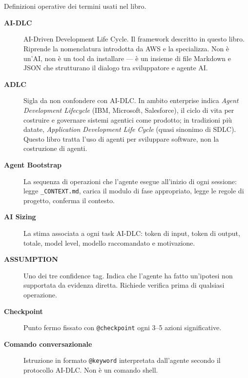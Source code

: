 ﻿%

\chapter{\LabelGlossary}
\label{app:glossario}

Definizioni operative dei termini usati nel libro.

\begin{description}

\item[\textbf{AI-DLC}] AI-Driven Development Life Cycle. Il framework descritto in questo libro. Riprende la nomenclatura introdotta da AWS e la specializza. Non è un'AI, non è un tool da installare --- è un insieme di file Markdown e JSON che strutturano il dialogo tra sviluppatore e agente AI.

\item[\textbf{ADLC}] Sigla da non confondere con AI-DLC. In ambito enterprise indica \textit{Agent Development Lifecycle} (IBM, Microsoft, Salesforce), il ciclo di vita per costruire e governare sistemi agentici come prodotto; in tradizioni più datate, \textit{Application Development Life Cycle} (quasi sinonimo di SDLC). Questo libro tratta l'uso di agenti per sviluppare software, non la costruzione di agenti.

\item[\textbf{Agent Bootstrap}] La sequenza di operazioni che l'agente esegue all'inizio di ogni sessione: legge \texttt{\_CONTEXT.md}, carica il modulo di fase appropriato, legge le regole di progetto, conferma il contesto.

\item[\textbf{AI Sizing}] La stima associata a ogni task AI-DLC: token di input, token di output, totale, model level, modello raccomandato e motivazione.

\item[\textbf{ASSUMPTION}] Uno dei tre confidence tag. Indica che l'agente ha fatto un'ipotesi non supportata da evidenza diretta. Richiede verifica prima di qualsiasi operazione.

\item[\textbf{Checkpoint}] Punto fermo fissato con \texttt{@checkpoint} ogni 3--5 azioni significative.

\item[\textbf{Comando conversazionale}] Istruzione in formato \texttt{@keyword} interpretata dall'agente secondo il protocollo AI-DLC. Non è un comando shell.


\end{description}
